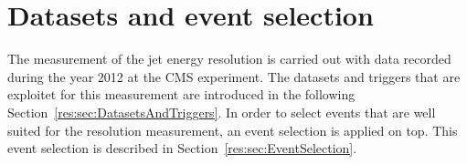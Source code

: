 \chapter{Datasets and event selection}

The measurement of the jet energy resolution is carried out with \GAMJET data recorded during the year 2012 at the CMS experiment.
The datasets and triggers that are exploitet for this measurement are introduced in the following Section~\ref{res:sec:DatasetsAndTriggers}.
In order to select \GAMJET events that are well suited for the resolution measurement, an event selection is applied on top. %
This event selection is described in Section~\ref{res:sec:EventSelection}.

